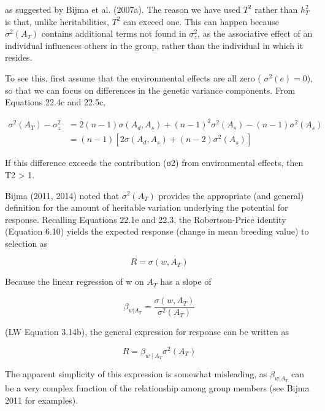 \documentclass{article}
\begin{document}
as suggested by Bijma et al. (2007a). The reason we have used  $ T^2 $ rather than  $ h_T^2 $ is that, unlike heritabilities,  $ T^2 $ can exceed one. This can happen because  $ \sigma^2(A_T) $ contains additional terms not found in  $ \sigma_z^2 $, as the associative effect of an individual influences others in the group, rather than the individual in which it resides.

To see this, first assume that the environmental effects are all zero ( $ \sigma^{2}(e) = 0 $), so that we can focus on differences in the genetic variance components. From Equations 22.4c and 22.5c,

\begin{equation}
\begin{aligned}\sigma^{2}(A_{T})-\sigma_{z}^{2}&=2(n-1)\sigma(A_{d},A_{s})+(n-1)^{2}\sigma^{2}(A_{s})-(n-1)\sigma^{2}(A_{s})\\&=(n-1)\left[2\sigma(A_{d},A_{s})+(n-2)\sigma^{2}(A_{s})\right]\end{aligned}
\tag{22.7b}
\label{eq:22_7b}
\end{equation}

If this difference exceeds the contribution (σ2) from environmental effects, then T2 > 1.

Bijma (2011, 2014) noted that  $ \sigma^{2}(A_{T}) $ provides the appropriate (and general) definition for the amount of heritable variation underlying the potential for response. Recalling Equations 22.1e and 22.3, the Robertson-Price identity (Equation 6.10) yields the expected response (change in mean breeding value) to selection as

\begin{equation}
R=\sigma(w,A_{T})
\tag{22.8a}
\label{eq:22_8a}
\end{equation}

Because the linear regression of w on  $ A_{T} $ has a slope of

\begin{equation}
\beta_{w|A_{T}}=\frac{\sigma(w,A_{T})}{\sigma^{2}(A_{T})}
\tag{22.8b}
\label{eq:22_8b}
\end{equation}

(LW Equation 3.14b), the general expression for response can be written as

\begin{equation}
R=\beta_{w\mid A_{T}}\sigma^{2}(A_{T})
\tag{22.8c}
\label{eq:22_8c}
\end{equation}

The apparent simplicity of this expression is somewhat misleading, as  $ \beta_{w|A_T} $ can be a very complex function of the relationship among group members (see Bijma 2011 for examples).
\end{document}
